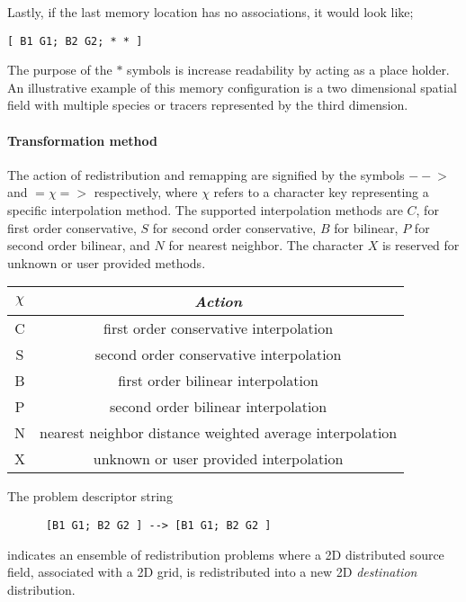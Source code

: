 Lastly, if the last memory location has no associations, it would look like;
\begin{center}
\begin{verbatim}
[ B1 G1; B2 G2; * * ]
\end{verbatim}
\end{center}
The purpose of the $\ast$ symbols is increase readability by acting as a place holder. An illustrative example of this memory configuration is a two dimensional spatial field with multiple species or tracers represented by the third dimension.

\paragraph{Transformation method}
The action of redistribution and remapping are signified by the symbols $-- \!\!\! >$ and $=\chi=>$ respectively, where $\chi$ refers to a character key representing a specific interpolation method. The supported interpolation methods are $C$, for first order conservative, $S$ for second order conservative, $B$ for bilinear, $P$ for second order bilinear, and $N$ for nearest neighbor. The character $X$ is reserved for unknown or user provided methods. 
\begin{center}
\begin{tabular}{| c | c |} \hline 
{$\chi$} & {\em Action} \\
\hline \hline
  C & first order conservative interpolation \\
  S & second order conservative interpolation \\
  B & first order bilinear interpolation \\
  P & second order bilinear interpolation \\
  N & nearest neighbor distance weighted average interpolation \\
  X & unknown or user provided interpolation \\
\hline
\end{tabular}
\end{center}

The problem descriptor string
\begin{center}
\begin{verbatim}
      [B1 G1; B2 G2 ] --> [B1 G1; B2 G2 ]
\end{verbatim}
\end{center}
indicates an ensemble of redistribution problems where a 2D distributed source field, associated with a 2D grid, is redistributed into a new  2D {\em destination} distribution. 


